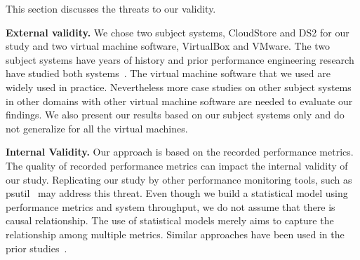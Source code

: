 This section discusses the threats to our validity.

\noindent \textbf{External validity.}
We chose two subject systems, CloudStore and DS2 for our study and two virtual machine software, VirtualBox and VMware. The two subject systems have years of history and prior performance engineering research have studied both systems~\cite{jackicsm2009,Nguyen:2012:ADP:2188286.2188344,tarekmsr16}. The virtual machine software that we used are widely used in practice. Nevertheless more case studies on other subject systems in other domains with other virtual machine software are needed to evaluate our findings. We also present our results based on our subject systems only and do not generalize for all the virtual machines.


\noindent \textbf{Internal Validity.}
Our approach is based on the recorded performance metrics. The quality of recorded performance metrics can impact the internal validity of our study. Replicating our study by other performance monitoring tools, such as psutil~\cite{psutil} may address this threat. Even though we build a statistical model using performance metrics and system throughput, we do not assume that there is causal relationship. The use of statistical models merely aims to capture the relationship among multiple metrics. Similar approaches have been used in the prior studies~\cite{Cohen:2005:CIC:1095810.1095821, Shang:2015:ADP:2668930.2688052, xiong2013vperfguard}. 



